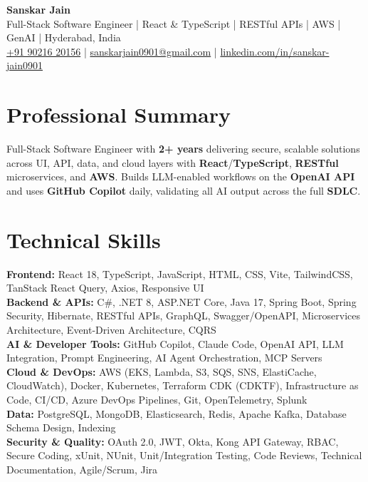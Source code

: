 \documentclass[a4paper,10pt]{article}
\begin{document}
\begin{center}
    {\LARGE \textbf{Sanskar Jain}} \\
    \vspace{2pt}
    Full-Stack Software Engineer \;|\; React \& TypeScript \;|\; RESTful APIs \;|\; AWS \;|\; GenAI \;|\; Hyderabad, India \\
    \vspace{2pt}
    \href{tel:+919021620156}{+91 90216 20156} \;|\;
    \href{mailto:sanskarjain0901@gmail.com}{sanskarjain0901@gmail.com} \;|\;
    \href{https://www.linkedin.com/in/sanskar-jain0901/}{linkedin.com/in/sanskar-jain0901}
\end{center}

\section*{Professional Summary}
Full-Stack Software Engineer with \textbf{2+ years} delivering secure, scalable solutions across UI, API, data, and cloud layers with \textbf{React}/\textbf{TypeScript}, \textbf{RESTful} microservices, and \textbf{AWS}.
Builds LLM-enabled workflows on the \textbf{OpenAI API} and uses \textbf{GitHub Copilot} daily, validating all AI output across the full \textbf{SDLC}.

\section*{Technical Skills}
\begin{sloppypar}
\noindent
\textbf{Frontend:} React 18, TypeScript, JavaScript, HTML, CSS, Vite, TailwindCSS, TanStack React Query, Axios, Responsive UI \\
\textbf{Backend \& APIs:} C\#, .NET 8, ASP.NET Core, Java 17, Spring Boot, Spring Security, Hibernate, RESTful APIs, GraphQL, Swagger/OpenAPI, Microservices Architecture, Event-Driven Architecture, CQRS \\
\textbf{AI \& Developer Tools:} GitHub Copilot, Claude Code, OpenAI API, LLM Integration, Prompt Engineering, AI Agent Orchestration, MCP Servers \\
\textbf{Cloud \& DevOps:} AWS (EKS, Lambda, S3, SQS, SNS, ElastiCache, CloudWatch), Docker, Kubernetes, Terraform CDK (CDKTF), Infrastructure as Code, CI/CD, Azure DevOps Pipelines, Git, OpenTelemetry, Splunk \\
\textbf{Data:} PostgreSQL, MongoDB, Elasticsearch, Redis, Apache Kafka, Database Schema Design, Indexing \\
\textbf{Security \& Quality:} OAuth 2.0, JWT, Okta, Kong API Gateway, RBAC, Secure Coding, xUnit, NUnit, Unit/Integration Testing, Code Reviews, Technical Documentation, Agile/Scrum, Jira
\end{sloppypar}
\end{document}
